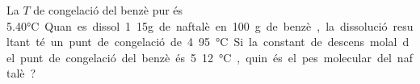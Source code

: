 \begin{qst}{}
La $T$ de congelació del benzè pur és 5.40\si\degreeCelsius. 
Quan es dissol 1.15g de naftalè en 100 g de benzè, la dissolució resultant té un punt de congelació de 4.95\si\degreeCelsius.
Si la constant de descens molal del punt de congelació del benzè és 5.12\si\degreeCelsius, quin és el pes molecular del naftalè?
\end{qst}
